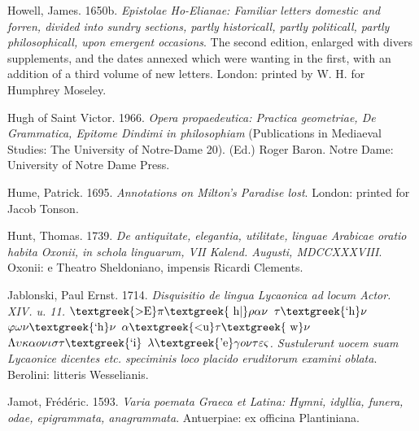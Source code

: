 \begin{styleStandard}
Howell, James. 1650b. \textit{Epistolae Ho-Elianae: Familiar letters domestic and forren, divided into sundry sections, partly historicall, partly politicall, partly philosophicall, upon emergent occasions}. The second edition, enlarged with divers supplements, and the dates annexed which were wanting in the first, with an addition of a third volume of new letters. London: printed by W. H. for Humphrey Moseley.
\end{styleStandard}

\begin{styleStandard}
Hugh of Saint Victor. 1966. \textit{Opera propaedeutica: Practica geometriae, De Grammatica, Epitome Dindimi in philosophiam} (Publications in Mediaeval Studies: The University of Notre-Dame 20). (Ed.) Roger Baron. Notre Dame: University of Notre Dame Press.
\end{styleStandard}

\begin{styleStandard}
Hume, Patrick. 1695. \textit{Annotations on Milton’s Paradise lost}. London: printed for Jacob Tonson.
\end{styleStandard}

\begin{styleStandard}
Hunt, Thomas. 1739. \textit{De antiquitate, elegantia, utilitate, linguae Arabicae oratio habita Oxonii, in schola linguarum, VII Kalend. Augusti, MDCCXXXVIII}. Oxonii: e Theatro Sheldoniano, impensis Ricardi Clements.
\end{styleStandard}

\begin{styleStandard}
Jablonski, Paul Ernst. 1714. \textit{Disquisitio de lingua Lycaonica ad locum Actor. XIV. u. 11. $\text{\textgreek{>E}}\pi \text{\textgreek{~h|}}\rho \alpha \nu $ $\tau \text{\textgreek{`h}}\nu $ $\varphi \omega \nu \text{\textgreek{`h}}\nu $ $\alpha \text{\textgreek{<u}}\tau \text{\textgreek{~w}}\nu $ $\Lambda \upsilon \kappa \alpha o\nu \iota \sigma \tau \text{\textgreek{`i}}$ $\lambda \text{\textgreek{'e}}\gamma o\nu \tau \varepsilon \varsigma $. Sustulerunt uocem suam Lycaonice dicentes etc. speciminis loco placido eruditorum examini oblata}. Berolini: litteris Wesselianis.
\end{styleStandard}

\begin{styleStandard}
Jamot, Frédéric. 1593. \textit{Varia poemata Graeca et Latina: Hymni, idyllia, funera, odae, epigrammata, anagrammata}. Antuerpiae: ex officina Plantiniana.
\end{styleStandard}

